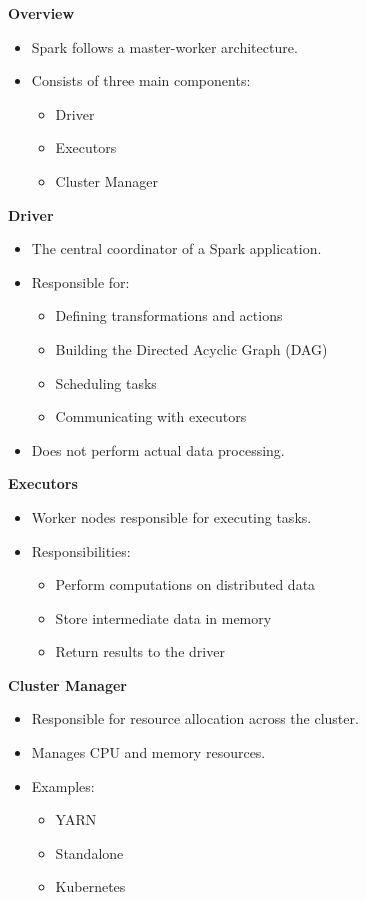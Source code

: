 \documentclass[10pt,a4paper]{article}
\begin{document}
	\textbf{Overview}
	\begin{itemize}
	    \item Spark follows a master-worker architecture.
	    \item Consists of three main components:
	    \begin{itemize}
	        \item Driver
	        \item Executors
	        \item Cluster Manager
	    \end{itemize}
	\end{itemize}
	
	\textbf{Driver}
	\begin{itemize}
	    \item The central coordinator of a Spark application.
	    \item Responsible for:
	    \begin{itemize}
	        \item Defining transformations and actions
	        \item Building the Directed Acyclic Graph (DAG)
	        \item Scheduling tasks
	        \item Communicating with executors
	    \end{itemize}
	    \item Does not perform actual data processing.
	\end{itemize}
	
	\textbf{Executors}
	\begin{itemize}
	    \item Worker nodes responsible for executing tasks.
	    \item Responsibilities:
	    \begin{itemize}
	        \item Perform computations on distributed data
	        \item Store intermediate data in memory
	        \item Return results to the driver
	    \end{itemize}
	\end{itemize}
	
	\textbf{Cluster Manager}
	\begin{itemize}
	    \item Responsible for resource allocation across the cluster.
	    \item Manages CPU and memory resources.
	    \item Examples:
	    \begin{itemize}
	        \item YARN
	        \item Standalone
	        \item Kubernetes
	    \end{itemize}
	\end{itemize}
	
\end{document}
